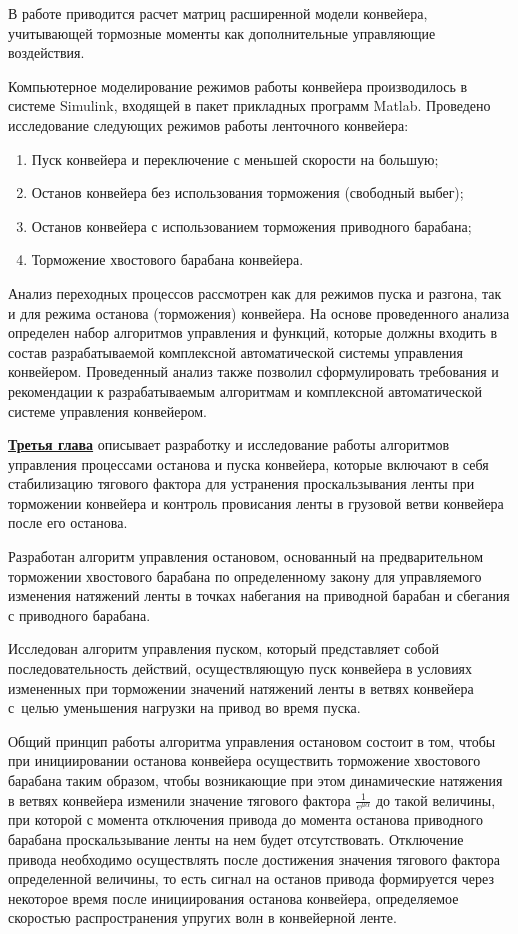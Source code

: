В работе приводится расчет матриц расширенной модели конвейера, учитывающей тормозные моменты как дополнительные управляющие воздействия.

Компьютерное моделирование режимов работы конвейера производилось в системе Simulink, входящей в пакет прикладных программ Matlab. Проведено исследование следующих режимов работы ленточного конвейера:
\begin{enumerate}
	\item Пуск конвейера и переключение с меньшей скорости на большую;
	\item Останов конвейера без использования торможения (свободный выбег);
	\item Останов конвейера с использованием торможения приводного барабана;
	\item Торможение хвостового барабана конвейера.
\end{enumerate}

Анализ переходных процессов рассмотрен как для режимов пуска и разгона, так и для режима останова (торможения) конвейера. На основе проведенного анализа определен набор алгоритмов управления и функций, которые должны входить в состав разрабатываемой комплексной автоматической системы управления конвейером. Проведенный анализ также позволил сформулировать требования и рекомендации к разрабатываемым алгоритмам и комплексной автоматической системе управления конвейером.
\bigskip

\underline{\textbf{Третья глава}} описывает разработку и исследование работы алгоритмов управления процессами останова и пуска конвейера, которые включают в себя стабилизацию тягового фактора для устранения проскальзывания ленты при торможении конвейера и контроль провисания ленты в грузовой ветви конвейера после его останова.

Разработан алгоритм управления остановом, основанный на предварительном торможении хвостового барабана по определенному закону для управляемого изменения натяжений ленты в точках набегания на приводной барабан и сбегания с приводного барабана. 

Исследован алгоритм управления пуском, который представляет собой последовательность действий, осуществляющую пуск конвейера в условиях измененных при торможении значений натяжений ленты в ветвях конвейера с~целью уменьшения нагрузки на привод во время пуска.
\bigskip

Общий принцип работы алгоритма управления остановом состоит в том, чтобы при инициировании останова конвейера осуществить торможение хвостового барабана таким образом, чтобы возникающие при этом динамические натяжения в ветвях конвейера изменили значение тягового фактора $ \frac{1}{e^{\mu\alpha}} $ до такой величины, при которой с момента отключения привода до момента останова приводного барабана проскальзывание ленты на нем будет отсутствовать. Отключение привода необходимо осуществлять после достижения значения тягового фактора определенной величины, то есть сигнал на останов привода формируется через некоторое время после инициирования останова конвейера, определяемое скоростью распространения упругих волн в конвейерной ленте.

